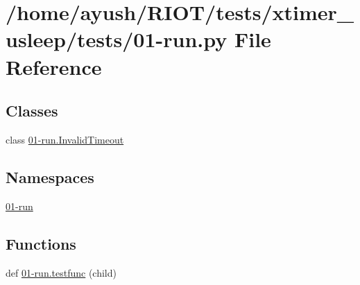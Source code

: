 \hypertarget{xtimer__usleep_2tests_201-run_8py}{}\section{/home/ayush/\+R\+I\+O\+T/tests/xtimer\+\_\+usleep/tests/01-\/run.py File Reference}
\label{xtimer__usleep_2tests_201-run_8py}
\subsection*{Classes}
\begin{DoxyCompactItemize}
\item 
class \hyperlink{class01-run_1_1InvalidTimeout}{01-\/run.\+Invalid\+Timeout}
\end{DoxyCompactItemize}
\subsection*{Namespaces}
\begin{DoxyCompactItemize}
\item 
 \hyperlink{namespace01-run}{01-\/run}
\end{DoxyCompactItemize}
\subsection*{Functions}
\begin{DoxyCompactItemize}
\item 
def \hyperlink{namespace01-run_aff983ffd4ab0e6bf8e7e58970e4a10bb}{01-\/run.\+testfunc} (child)
\end{DoxyCompactItemize}
